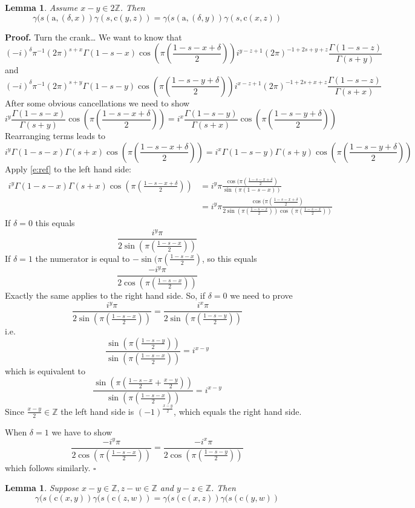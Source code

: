 \documentclass[10pt,leqno]{article}
\newtheorem{lemma}[equation]{Lemma}
\newcommand{\qed}{\hfill $\square$ \medskip}
\newenvironment{proof}[1][Proof]{\noindent\textbf{#1.} }{\qed}
\newcommand{\Z}{\mathbb Z}
\renewcommand{\a}{\mathfrak a}
\newcommand\inv{^{-1}}
\renewcommand{\a}{\mathrm a}
\renewcommand{\c}{\mathrm c}
\begin{document}
\begin{lemma}
  Assume $x-y\in2\Z$. Then
$$
  \gamma(s(\a,(\delta,x))\gamma(s,\c(y,z))=
  \gamma(s(\a,(\delta,y))\gamma(s,\c(x,z))
  $$
\end{lemma}

\begin{proof}
  Turn the crank\dots
  We want to know that
$$
  (-i)^\delta\pi\inv(2\pi)^{s+x}\Gamma(1-s-x)\cos(\pi(\frac{1-s-x+\delta}2))
  i^{y-z+1}(2\pi)^{-1+2s+y+z}\frac{\Gamma(1-s-z)}{\Gamma(s+y)}
  $$
  and
$$
(-i)^\delta\pi\inv(2\pi)^{s+y}\Gamma(1-s-y)\cos(\pi(\frac{1-s-y+\delta}2))
i^{x-z+1}(2\pi)^{-1+2s+x+z}\frac{\Gamma(1-s-z)}{\Gamma(s+x)}
$$
After some obvious cancellations we need to show
$$
i^y\frac{\Gamma(1-s-x)}{\Gamma(s+y)}\cos(\pi(\frac{1-s-x+\delta}2))
=
i^x\frac{\Gamma(1-s-y)}{\Gamma(s+x)}\cos(\pi(\frac{1-s-y+\delta}2))
$$
Rearranging terms leads to
$$
i^y\Gamma(1-s-x)\Gamma(s+x)\cos(\pi(\frac{1-s-x+\delta}2))
=
i^x\Gamma(1-s-y)\Gamma(s+y)\cos(\pi(\frac{1-s-y+\delta}2))
$$
Apply \eqref{e:ref} to the left hand side:
$$
\begin{aligned}
  i^y\Gamma(1-s-x)\Gamma(s+x)\cos(\pi(\frac{1-s-x+\delta}2))
&=
i^y\pi\frac{\cos(\pi(\frac{1-s-x+\delta}2)}{\sin(\pi(1-s-x))}\\
&=
i^y\pi\frac{\cos(\pi(\frac{1-s-x+\delta}2)}{2\sin(\pi(\frac{1-s-x}2))\cos(\pi(\frac{1-s-x}2))}
\end{aligned}
$$
If $\delta=0$ this equals
$$
\frac{i^y\pi}{2\sin(\pi(\frac{1-s-x}2))}
$$
If $\delta=1$ the numerator is equal to $-\sin(\pi(\frac{1-s-x}2)$, so this equals
$$
\frac{-i^y\pi}{2\cos(\pi(\frac{1-s-x}2))}
$$
Exactly the same applies to the right hand side. So, if $\delta=0$ we need to prove
$$
\frac{i^y\pi}{2\sin(\pi(\frac{1-s-x}2))}
=
\frac{i^x\pi}{2\sin(\pi(\frac{1-s-y}2))}
$$
i.e.
$$
\frac{\sin(\pi(\frac{1-s-y}2))}
     {\sin(\pi(\frac{1-s-x}2))}=i^{x-y}
     $$
     which is equivalent to
$$
\frac{\sin(\pi(\frac{1-s-x}2+\frac{x-y}2))}
{\sin(\pi(\frac{1-s-x}2))}=i^{x-y}
$$
Since $\frac{x-y}2\in\Z$ the left hand side is $(-1)^{\frac{x-y}2}$, which equals the right hand side.

  When $\delta=1$ we have to show
$$
\frac{-i^y\pi}{2\cos(\pi(\frac{1-s-x}2))}
=
\frac{-i^x\pi}{2\cos(\pi(\frac{1-s-y}2))}
$$
which follows similarly.
\end{proof}

\begin{lemma}

  Suppose $x-y\in\Z, z-w\in\Z$ and $y-z\in\Z$. Then
$$
\gamma(s(\c(x,y))\gamma(s(\c(z,w))=
\gamma(s(\c(x,z))\gamma(s(\c(y,w))
$$
\end{lemma}
\end{document}
